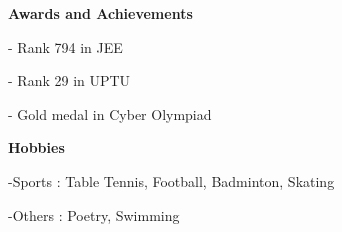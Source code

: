 \documentclass[12pt]{article}
\begin{document}
\begin{flushleft}
\bigskip

\textbf{\Large Awards and Achievements}

\bigskip

\hspace{3mm}- Rank 794 in JEE

\hspace{3mm}- Rank 29 in UPTU

\hspace{3mm}- Gold medal in Cyber Olympiad

\bigskip

\textbf{\Large Hobbies}

\hspace{3mm}-Sports : Table Tennis, Football, Badminton, Skating

\hspace{3mm}-Others : Poetry, Swimming

\bigskip

\date{\vspace{-5ex}}
\author{Abhay Singh}

\end{flushleft}
\end{document}
